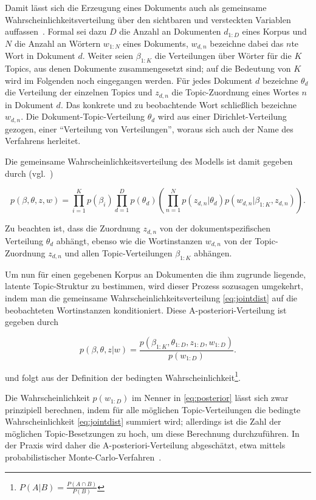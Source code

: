 \documentclass[11pt,a4paper,twoside]{article}
\let\rmarkdownfootnote\footnote%
\def\footnote{\protect\rmarkdownfootnote}
\begin{document}
Damit lässt sich die Erzeugung eines Dokuments auch als gemeinsame
Wahrscheinlichkeitsverteilung über den sichtbaren und versteckten
Variablen auffassen~\autocite{Blei2012}. Formal sei dazu \(D\) die
Anzahl an Dokumenten \(d_{1:D}\) eines Korpus und \(N\) die Anzahl an
Wörtern \(w_{1:N}\) eines Dokuments, \(w_{d,n}\) bezeichne dabei das
\(n\)te Wort in Dokument \(d\). Weiter seien \(\beta_{1:K}\) die
Verteilungen über Wörter für die \(K\) Topics, aus denen Dokumente
zusammengesetzt sind; auf die Bedeutung von \(K\) wird im Folgenden noch
eingegangen werden. Für jedes Dokument \(d\) bezeichne \(\theta_d\) die
Verteilung der einzelnen Topics und \(z_{d,n}\) die Topic-Zuordnung
eines Wortes \(n\) in Dokument \(d\). Das konkrete und zu beobachtende
Wort schließlich bezeichne \(w_{d,n}\). Die Dokument-Topic-Verteilung
\(\theta_{d}\) wird aus einer Dirichlet-Verteilung gezogen, einer
\enquote{Verteilung von Verteilungen}, woraus sich auch der Name des
Verfahrens herleitet.

Die gemeinsame Wahrscheinlichkeitsverteilung des Modells ist damit
gegeben durch (vgl.~\autocite{Blei2012})

\begin{equation}
p(\beta, \theta, z, w) = \prod_{i=1}^{K}p(\beta_i) \prod_{d=1}^{D}p(\theta_d)\left( \prod_{n=1}^{N}p(z_{d,n} | \theta_{d})p(w_{d,n}|\beta_{1:K}, z_{d,n}) \right).
\label{eq:jointdist}
\end{equation}

Zu beachten ist, dass die Zuordnung \(z_{d,n}\) von der
dokumentspezifischen Verteilung \(\theta_d\) abhängt, ebenso wie die
Wortinstanzen \(w_{d,n}\) von der Topic-Zuordnung \(z_{d,n}\) und allen
Topic-Verteilungen \(\beta_{1:K}\) abhängen.

Um nun für einen gegebenen Korpus an Dokumenten die ihm zugrunde
liegende, latente Topic-Struktur zu bestimmen, wird dieser Prozess
sozusagen umgekehrt, indem man die gemeinsame
Wahrscheinlichkeitsverteilung \eqref{eq:jointdist} auf die beobachteten
Wortinstanzen konditioniert. Diese A-posteriori-Verteilung ist gegeben
durch

\begin{equation}
p(\beta, \theta, z | w) = \frac{p(\beta_{1:K}, \theta_{1:D}, z_{1:D}, w_{1:D})}{p(w_{1:D})}.
\label{eq:posterior}
\end{equation}

und folgt aus der Definition der bedingten Wahrscheinlichkeit\footnote{\(P(A|B) = \frac{P(A \cap B)}{P(B)}\)}.

Die Wahrscheinlichkeit \(p(w_{1:D})\) im Nenner in \eqref{eq:posterior}
lässt sich zwar prinzipiell berechnen, indem für alle möglichen
Topic-Verteilungen die bedingte Wahrscheinlichkeit \eqref{eq:jointdist}
summiert wird; allerdings ist die Zahl der möglichen Topic-Besetzungen
zu hoch, um diese Berechnung durchzuführen. In der Praxis wird daher die
A-posteriori-Verteilung abgeschätzt, etwa mittels probabilistischer
Monte-Carlo-Verfahren~\autocite{Griffiths2004}.
\end{document}
